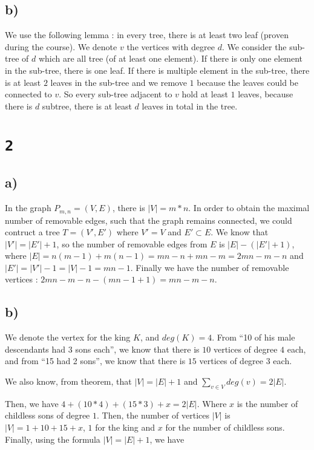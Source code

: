 \documentclass[a4paper,11pt]{report}
\begin{document}
\subsection*{b)}

We use the following lemma : in every tree, there is at least two leaf (proven
during the course). We denote $v$ the vertices with degree $d$. We consider the
sub-tree of $d$ which are all tree (of at least one element). If there is only
one element in the sub-tree, there is one leaf. If there is multiple element in
the sub-tree, there is at least $2$ leaves in the sub-tree and we remove $1$
because the leaves could be connected to $v$. So every sub-tree adjacent to $v$
hold at least $1$ leaves, because there is $d$ subtree, there is at least $d$
leaves in total in the tree.

\section*{\texttt{2}}

\subsection*{a)}

In the graph $P_{m,n} = (V,E)$, there is $|V| = m * n$. In order to obtain the maximal
number of removable edges, such that the graph remains connected, we could
contruct a tree $T = (V',E')$ where $V' = V$ and $E' \subset E$. We know
that $|V'| = |E'| + 1$, so the number of removable edges from $E$ is $|E| -
(|E'| + 1)$, where $|E| = n(m-1) + m(n-1) = mn - n + mn - m = 2mn - m - n $ and
$|E'| = |V'| - 1 = |V| - 1 = mn - 1$. Finally we have the number of removable
vertices : $2mn - m - n - (mn - 1 + 1) = mn - m - n$.

\subsection*{b)}

We denote the vertex for the king $K$, and $deg(K)= 4$. From ``10 of his male
descendants had $3$ sons each'', we know that there is $10$ vertices of degree
$4$ each, and from ``15 had 2 sons'', we know that there is $15$ vertices of
degree $3$ each.

We also know, from theorem, that $|V| = |E| + 1$ and $\sum_{v \in V} deg(v) = 2|E|$.

Then, we have $4 + (10 * 4) + (15 * 3) + x = 2|E|$. Where $x$ is the number of
childless sons of degree $1$. Then, the number of vertices $|V|$ is $|V| = 1 +
10 + 15 + x$, $1$ for the king and $x$ for the number of childless sons.
Finally, using the formula $|V| = |E| + 1$, we have
\end{document}
